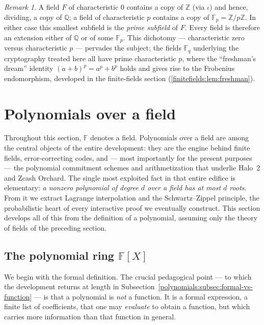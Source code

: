 \documentclass[11pt,a4paper]{article}
\theoremstyle{definition}
\theoremstyle{remark}
\newtheorem{remark}[theorem]{Remark}
\newcommand{\Z}{\ensuremath{\mathbb{Z}}}
\newcommand{\Q}{\ensuremath{\mathbb{Q}}}
\newcommand{\F}{\ensuremath{\mathbb{F}}}
\newcommand{\Fp}{\ensuremath{\mathbb{F}_{p}}}
\newcommand{\Fq}{\ensuremath{\mathbb{F}_{q}}}
\begin{document}
\begin{remark}\label{ringsfields:rem-prime-subfield}
A field \(F\) of characteristic \(0\) contains a copy of \(\Z\) (via \(\iota\)) and hence, dividing, a copy of \(\Q\); a field of characteristic \(p\) contains a copy of \(\Fp = \Z/p\Z\). In either case this smallest subfield is the \emph{prime subfield} of \(F\). Every field is therefore an extension either of \(\Q\) or of some \(\Fp\). This dichotomy --- characteristic zero versus characteristic \(p\) --- pervades the subject; the fields \(\Fq\) underlying the cryptography treated here all have prime characteristic \(p\), where the ``freshman's dream'' identity \((a+b)^p = a^p + b^p\) holds and gives rise to the Frobenius endomorphism, developed in the finite-fields section (\cref{finitefields:lem:freshman}).
\end{remark}

\section{Polynomials over a field}\label{sec:polynomials}

Throughout this section, \(\F\) denotes a field. Polynomials over a field are
among the central objects of the entire development: they are the engine behind
finite fields, error-correcting codes, and — most importantly for the present
purposes —
the polynomial commitment schemes and arithmetization that underlie Halo~2 and
Zcash Orchard. The single most exploited fact in that entire edifice is
elementary: \emph{a nonzero polynomial of degree \(d\) over a field has at most \(d\)
roots}. From it we extract Lagrange interpolation and the Schwartz--Zippel
principle, the probabilistic heart of every interactive proof we eventually
construct. This section develops all of this from the definition of a polynomial,
assuming only the theory of fields of the preceding section.

\subsection{The polynomial ring \texorpdfstring{\(\F[X]\)}{F[X]}}
\label{polynomials:subsec:ring}

We begin with the formal definition. The crucial pedagogical point — to which the
development returns at length in Subsection~\ref{polynomials:subsec:formal-vs-function} — is
that a polynomial is \emph{not} a function. It is a formal expression, a finite
list of coefficients, that one may \emph{evaluate} to obtain a function, but which
carries more information than that function in general.
\end{document}
